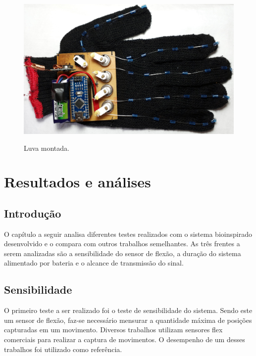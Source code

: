 \documentclass[
	12pt,				%
	openright,			%
	oneside,			%
	a4paper,			%
	english,			%
	brazil				%
	]{abntex2}
\begin{document}
		\begin{figure}[h!]
			\centering
			\caption{Luva montada.}
  		\includegraphics[width=14cm,keepaspectratio=true]{figures/glove-ready1.jpg}
  		\label{Fig:glove-ready1}
		\end{figure}


		\chapter{Resultados e análises}

		\section{Introdução}

		O capítulo a seguir analisa diferentes testes realizados com o sistema bioinspirado desenvolvido e o compara com outros trabalhos semelhantes. As três frentes a serem analizadas são a sensibilidade do sensor de flexão, a duração do sistema alimentado por bateria e o alcance de transmissão do sinal.
		

		\section{Sensibilidade}

		O primeiro teste a ser realizado foi o teste de sensibilidade do sistema. Sendo este um sensor de flexão, faz-se necessário mensurar a quantidade máxima de posições capturadas em um movimento. Diversos trabalhos utilizam sensores flex comerciais para realizar a captura de movimentos. O desempenho de um desses trabalhos foi utilizado como referência.
\end{document}
